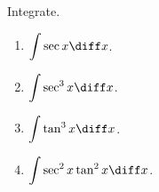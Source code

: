 Integrate.
\begin{enumerate}[ref=\fcProblemRef]
\item \label{problemintsecxdx} $\displaystyle \int \sec x  \diff x$.

\item \label{problemintsec^3xdx} $\displaystyle \int \sec^3x  \diff x$.

\item $\displaystyle \int \tan^3x \diff x$.

\item $\displaystyle \int \sec^2x\tan^2x \diff x$.

\end{enumerate}